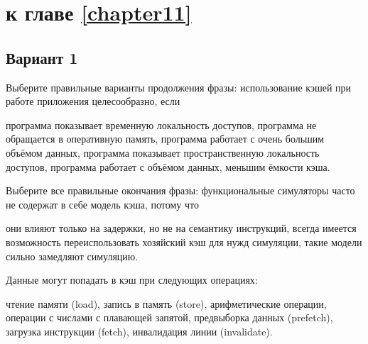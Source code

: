 \section{\Questions к главе \ref{chapter11}} %

\subsection*{Вариант 1}

\begin{questions}
\question[3] Выберите правильные варианты продолжения фразы: использование кэшей при работе приложения целесообразно, если
\begin{choices}
    \correctchoice    программа показывает временную локальность доступов,
    \choice программа не обращается в оперативную память,
    \choice программа работает с очень большим объёмом данных,
    \correctchoice программа показывает пространственную локальность доступов,
    \choice программа работает с объёмом данных, меньшим ёмкости кэша.
\end{choices}

\question[3] Выберите все правильные окончания фразы: функциональные симуляторы часто не содержат в себе модель кэша, потому что
\begin{choices}
    \correctchoice они влияют только на задержки, но не на семантику инструкций,
    \choice всегда имеется возможность переиспользовать хозяйский кэш для нужд симуляции,
    \correctchoice такие модели сильно замедляют симуляцию.
\end{choices}

\question[3] Данные могут попадать в кэш при следующих операциях:
\begin{choices}
    \correctchoice чтение памяти (load),
    \correctchoice запись в память (store),
    \choice арифметические операции,
    \choice операции с числами с плавающей запятой,
    \correctchoice предвыборка данных (prefetch),
    \correctchoice загрузка инструкции (fetch),
    \choice инвалидация линии (invalidate).
\end{choices}

\end{questions}

